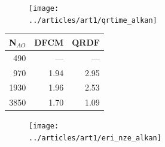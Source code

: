 \begin{figure}
\begin{subfigure}{\textwidth}

\begin{subfigure}{0.45\textwidth}
\vspace{0pt}
\centering
\texttt{[image: ../articles/art1/qrtime\_alkan]}
\end{subfigure}
\hfill
\begin{subtable}{0.45\textwidth}
\centering
\begin{tabular}{rrr}
\hline
N$_{AO}$ & DFCM & QRDF \\ \hline
490 & --- & --- \\ 
970 & 1.94 & 2.95 \\ 
1930 & 1.96 & 2.53 \\ 
3850 & 1.70 & 1.09 \\ \hline
\end{tabular}
\end{subtable}
\caption{}
\label{fig:GS_BTIME_ALKAN}
\end{subfigure}

\vspace{1.5\baselineskip}

\begin{subfigure}{\textwidth}
\begin{subfigure}{0.45\textwidth}
\centering
\texttt{[image: ../articles/art1/eri\_nze\_alkan]}
\end{subfigure}
\hfill
\begin{subtable}{0.45\textwidth}
\centering
{}
\end{subtable}
\caption{}
\label{fig:GS_BNZE_ALKAN}
\end{subfigure}

\vspace{1.5\baselineskip}


\end{figure}
